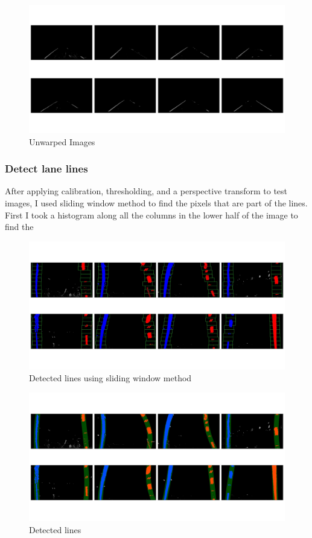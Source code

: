 \documentclass[12pt,a4paper,onecolumn]{report}
\begin{document}
\begin{figure}[H]
\centering
\includegraphics[width=\textwidth]{output_images/grid_images/grid_unwarped_image.jpg}
\caption{Unwarped Images}
\end{figure}


\subsubsection*{Detect lane lines}

After applying calibration, thresholding, and a perspective transform to test images, I used sliding window method to find the pixels that are part of the lines. First I took a histogram along all the columns in the lower half of the image to find the 
\begin{figure}[H]
\centering
\includegraphics[width=\textwidth]{output_images/grid_images/grid_window_image.jpg}
\caption{Detected lines using sliding window method}
\end{figure}

\begin{figure}[H]
\centering
\includegraphics[width=\textwidth]{output_images/grid_images/grid_line_images.jpg}
\caption{Detected lines}
\end{figure}
\end{document}
